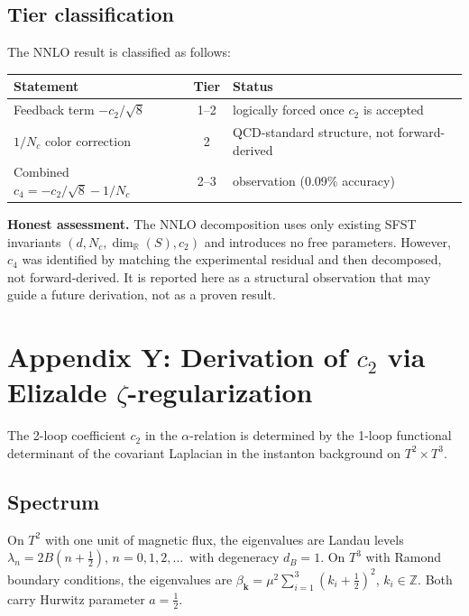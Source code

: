 \documentclass[11pt,a4paper]{article}
\begin{document}
\subsection{Tier classification}

The NNLO result is classified as follows:

\begin{center}
\renewcommand{\arraystretch}{1.2}
\begin{tabular}{p{}cp{}}
\toprule
Statement & Tier & Status\\
\midrule
Feedback term $-c_2/\sqrt{8}$ & 1--2 & logically forced
  once $c_2$ is accepted\\
$1/N_c$ color correction & 2 & QCD-standard structure,
  not forward-derived\\
Combined $c_4=-c_2/\sqrt{8}-1/N_c$ & 2--3 & observation
  (0.09\% accuracy)\\
\bottomrule
\end{tabular}
\end{center}

\textbf{Honest assessment.}  The NNLO decomposition uses only existing
SFST invariants $(d, N_c, \dim_\mathbb{R}(S), c_2)$ and introduces no
free parameters.  However, $c_4$ was identified by matching the
experimental residual and then decomposed, not forward-derived.  It is
reported here as a structural observation that may guide a future
derivation, not as a proven result.

\section{Appendix Y: Derivation of $c_2$ via Elizalde $\zeta$-regularization}
\label{sec:elizalde}

The 2-loop coefficient $c_2$ in the $\alpha$-relation is determined by
the 1-loop functional determinant of the covariant Laplacian in the
instanton background on $T^2\times T^3$.

\subsection{Spectrum}

On $T^2$ with one unit of magnetic flux, the eigenvalues are Landau
levels $\lambda_n=2B(n+\tfrac12)$, $n=0,1,2,\ldots$\, with degeneracy
$d_B=1$.  On $T^3$ with Ramond boundary conditions, the eigenvalues are
$\beta_{\mathbf{k}}=\mu^2\sum_{i=1}^3(k_i+\tfrac12)^2$,
$k_i\in\mathbb{Z}$.  Both carry Hurwitz parameter $a=\tfrac12$.
\end{document}
